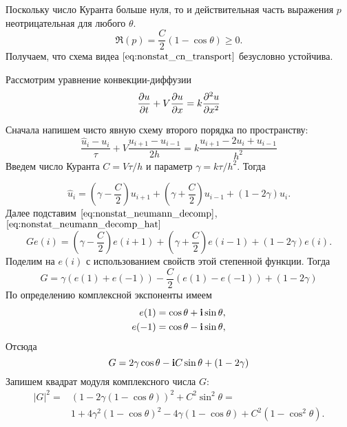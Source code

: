 Поскольку число Куранта больше нуля, то и действительная часть выражения $p$ неотрицательная для любого $\theta$.
\begin{equation*}
    \Re(p) = \frac{C}{2} \left(1 - \cos\theta\right) \geq 0.
\end{equation*}
Получаем, что схема видеа $\eqref{eq:nonstat_cn_transport}$ безусловно устойчива.

\label{sec:NonstatExpConvDiff}

Рассмотрим уравнение конвекции-диффузии
\begin{equation}
    \label{eq:nonstat_convdiff}
    \frac{\partial u}{\partial t} + V\frac{\partial u}{\partial x} = k\frac{\partial^2 u}{\partial x^2}
\end{equation}

Сначала напишем чисто явную схему второго порядка по пространству:
\begin{equation}
    \label{eq:nonstat_convdiff_explicit}
    \frac{\hat u_i - u_i}{\tau} + V\frac{u_{i+1} - u_{i-1}}{2h} = k\frac{u_{i+1} - 2 u_{i} + u_{i-1}}{h^2}
\end{equation}
Введем число Куранта $C = V \tau/h$ и параметр $\gamma = k \tau / h^2$. Тогда

\begin{equation*}
    \hat u_i = \left(\gamma - \frac{C}{2}\right) u_{i+1} + \left(\gamma + \frac{C}{2}\right) u_{i-1} + (1 - 2\gamma) u_i.
\end{equation*}
Далее подставим $\eqref{eq:nonstat_neumann_decomp}$, $\eqref{eq:nonstat_neumann_decomp_hat}$
\begin{equation*}
    G e(i) = \left(\gamma - \frac{C}{2}\right) e(i+1) + \left(\gamma + \frac{C}{2}\right) e(i-1) + (1 - 2\gamma) e(i).
\end{equation*}
Поделим на $e(i)$ с использованием свойств этой степенной функции. Тогда
\begin{equation*}
    G = \gamma(e(1) + e(-1)) - \frac {C}{2} (e(1) - e(-1)) + (1 - 2\gamma)
\end{equation*}
По определению комплексной экспоненты имеем
\begin{align*}
    e(1) &= \cos \theta + \mathbf{i} \sin\theta,\\
    e(-1) &= \cos \theta - \mathbf{i} \sin\theta,
\end{align*}
Отсюда
\begin{equation*}
    G = 2\gamma\cos\theta - \mathbf{i} {C} \sin\theta + (1 - 2\gamma)
\end{equation*}
Запишем квадрат модуля комплексного числа $G$:
\begin{align*}
    |G|^2 = & \left(1 - 2\gamma(1-\cos\theta)\right)^2 + C^2 \sin^2\theta =\\
            & 1 + 4 \gamma^2(1-\cos\theta)^2 - 4\gamma(1-\cos\theta) + C^2 (1 - \cos^2\theta).
\end{align*}

